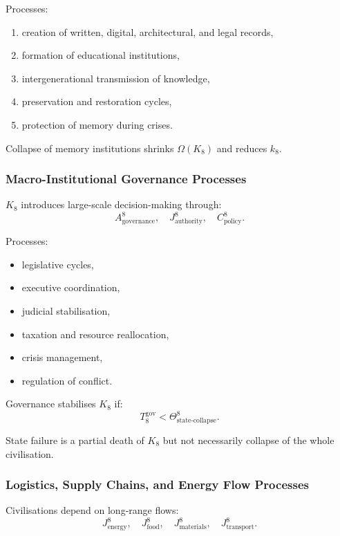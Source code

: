 Processes:
\begin{enumerate}
    \item creation of written, digital, architectural, and legal records,
    \item formation of educational institutions,
    \item intergenerational transmission of knowledge,
    \item preservation and restoration cycles,
    \item protection of memory during crises.
\end{enumerate}

Collapse of memory institutions shrinks $\Omega(K_8)$ and reduces $k_8$.

\subsubsection{Macro-Institutional Governance Processes}

$K_8$ introduces large-scale decision-making through:
\[
A^8_{\text{governance}},\quad J^8_{\text{authority}},\quad 
C^8_{\text{policy}}.
\]

Processes:
\begin{itemize}
    \item legislative cycles,
    \item executive coordination,
    \item judicial stabilisation,
    \item taxation and resource reallocation,
    \item crisis management,
    \item regulation of conflict.
\end{itemize}

Governance stabilises $K_8$ if:
\[
T_8^{\text{gov}} < \Theta^8_{\text{state-collapse}}.
\]

State failure is a partial death of $K_8$ but not necessarily collapse 
of the whole civilisation.

\subsubsection{Logistics, Supply Chains, and Energy Flow Processes}

Civilisations depend on long-range flows:
\[
J^8_{\text{energy}},\quad 
J^8_{\text{food}},\quad 
J^8_{\text{materials}},\quad
J^8_{\text{transport}}.
\]

